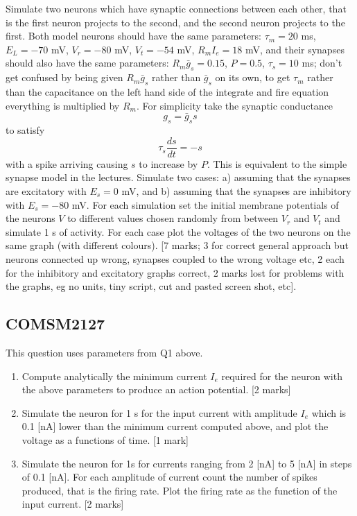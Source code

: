 \documentclass[12pt]{article}
\begin{document}
Simulate two neurons which have synaptic connections between
  each other, that is the first neuron projects to the second, and the
  second neuron projects to the first. Both model neurons should have
  the same parameters: $\tau_m = 20$ ms, $E_L = -70$ mV, $V_r = -80$ mV,
  $V_t = -54$ mV, $R_mI_e = 18$ mV, and their synapses should also have
  the same parameters: $R_m \bar{g}_s = 0.15$, $P = 0.5$, $\tau_s= 10$
  ms; don't get confused by being given $R_m\bar{g}_s$ rather than
  $\bar{g}_s$ on its own, to get $\tau_m$ rather than the capacitance
  on the left hand side of the integrate and fire equation everything
  is multiplied by $R_m$. For simplicity take the synaptic conductance
\begin{equation}
g_s=\bar{g}_s s
\end{equation}
to satisfy
\begin{equation}
\tau_s\frac{ds}{dt}=-s
\end{equation}
with a spike arriving causing $s$ to increase by $P$. This is
equivalent to the simple synapse model in the lectures. Simulate two
cases: a) assuming that the synapses are excitatory with $E_s = 0$ mV,
and b) assuming that the synapses are inhibitory with $E_s = -80$
mV. For each simulation set the initial membrane potentials of the
neurons $V$ to different values chosen randomly from between $V_r$ and
$V_t$ and simulate 1 s of activity. For each case plot the voltages of
the two neurons on the same graph (with different colours). [7 marks;
  3 for correct general approach but neurons connected up wrong,
  synapses coupled to the wrong voltage etc, 2 each for the inhibitory
  and excitatory graphs correct, 2 marks lost for problems with the
  graphs, eg no units, tiny script, cut and pasted screen shot, etc].

\subsection*{COMSM2127}

This question uses parameters from Q1 above.

\begin{enumerate}

\item Compute analytically the minimum current $I_e$ required for the
  neuron with the above parameters to produce an action
  potential. [2 marks]

\item Simulate the neuron for 1 s for the input current with amplitude
  $I_e$ which is 0.1 [nA] lower than the minimum current computed
  above, and plot the voltage as a functions of time. [1 mark]

\item Simulate the neuron for 1s for currents ranging from 2 [nA] to 5
  [nA] in steps of 0.1 [nA]. For each amplitude of current count the
  number of spikes produced, that is the firing rate. Plot the firing
  rate as the function of the input current. [2 marks]

\end{enumerate}
\end{document}
